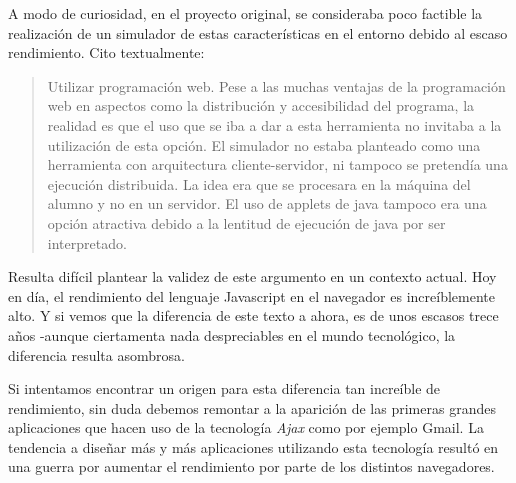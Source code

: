 A modo de curiosidad, en el proyecto original, se consideraba poco factible la realización de 
un simulador de estas características en el entorno debido al escaso rendimiento. Cito textualmente:

\begin{quotation}
Utilizar programación web. Pese a las muchas ventajas de la programación
web en aspectos como la distribución y accesibilidad del programa, la realidad
es que el uso que se iba a dar a esta herramienta no invitaba a la utilización de
esta opción. El simulador no estaba planteado como una herramienta con
arquitectura cliente-servidor, ni tampoco se pretendía una ejecución distribuida.
La idea era que se procesara en la máquina del alumno y no en un servidor. El
uso de applets de java tampoco era una opción atractiva debido a la lentitud de
ejecución de java por ser interpretado.
\end{quotation} 

\bigskip
Resulta difícil plantear la validez de este argumento en un contexto actual. Hoy en día,
el rendimiento del lenguaje Javascript en el navegador es increíblemente alto. Y si vemos que la diferencia 
de este texto a ahora, es de unos escasos trece años -aunque ciertamenta nada despreciables en el mundo 
tecnológico, la diferencia resulta asombrosa.
 
\bigskip
Si intentamos encontrar un origen para esta diferencia tan increíble de rendimiento, sin duda
debemos remontar a la aparición de las primeras grandes aplicaciones que hacen uso de la tecnología
\textit{Ajax} como por ejemplo Gmail. La tendencia a diseñar más y más aplicaciones utilizando esta
tecnología resultó en una guerra por aumentar el rendimiento por parte de los distintos navegadores.
